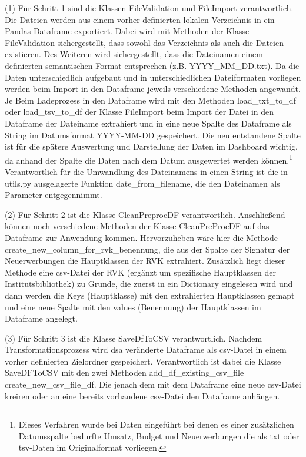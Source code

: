     (1) Für Schritt 1 sind die Klassen FileValidation und FileImport verantwortlich.
    Die Dateien werden aus einem vorher definierten lokalen Verzeichnis in ein Pandas Dataframe exportiert. Dabei wird mit Methoden
    der Klasse FileValidation sichergestellt, dass sowohl das Verzeichnis als auch die Dateien existieren. Des Weiteren wird sichergestellt,
    dass die Dateinamen einem definierten semantischen Format entsprechen (z.B. YYYY\_MM\_DD.txt). 
    Da die Daten unterschiedlich aufgebaut und in unterschiedlichen Dateiformaten vorliegen werden beim Import in den Dataframe jeweils verschiedene Methoden angewandt. Je
    Beim Ladeprozess in den Dataframe wird mit den Methoden load\_txt\_to\_df oder load\_tsv\_to\_df der Klasse FileImport beim Import der Datei in den Dataframe der Dateiname
    extrahiert und in eine neue Spalte des Dataframe als String im Datumsformat YYYY-MM-DD gespeichert. Die neu entstandene Spalte ist für die spätere Auswertung und
    Darstellung der Daten im Dashboard wichtig, da anhand der Spalte die Daten nach dem Datum ausgewertet werden können.\footnote{Dieses Verfahren wurde bei Daten eingeführt
    bei denen es einer zusätzlichen Datumsspalte bedurfte Umsatz,
    Budget und Neuerwerbungen die als txt oder tsv-Daten im Originalformat vorliegen.} Verantwortlich für die Umwandlung des Dateinamens in einen String ist die in utils.py
    ausgelagerte Funktion date\_from\_filename, die den Dateinamen als Parameter entgegennimmt. 
    
    (2) Für Schritt 2 ist die Klasse CleanPreprocDF verantwortlich. 
    Anschließend können noch verschiedene Methoden der Klasse CleanPreProcDF auf das Dataframe zur Anwendung kommen. Hervorzuheben wäre hier die Methode 
    create\_new\_column\_for\_rvk\_benennung, die aus der Spalte der Signatur der Neuerwerbungen die Hauptklassen der RVK extrahiert. Zusätzlich liegt dieser Methode eine csv-Datei
    der RVK (ergänzt um spezifische Hauptklassen der Institutsbibliothek) zu Grunde, die zuerst in ein Dictionary eingelesen wird und dann werden die Keys (Hauptklasse) mit den
    extrahierten Hauptklassen gemapt und eine neue Spalte mit den values (Benennung) der Hauptklassen im Dataframe angelegt.    
    
    
    (3)  Für Schritt 3 ist die Klasse SaveDfToCSV verantwortlich.
    Nachdem Transformationsprozess wird dsa veränderte Dataframe als csv-Datei in einem vorher definierten Zielordner gespeichert. Verantwortlich ist dabei die Klasse    
    SaveDFToCSV mit den zwei Methoden add\_df\_existing\_csv\_file create\_new\_csv\_file\_df. Die jenach dem mit dem Dataframe eine neue csv-Datei kreiren oder an eine bereits       
    vorhandene csv-Datei den Dataframe anhängen.
    
